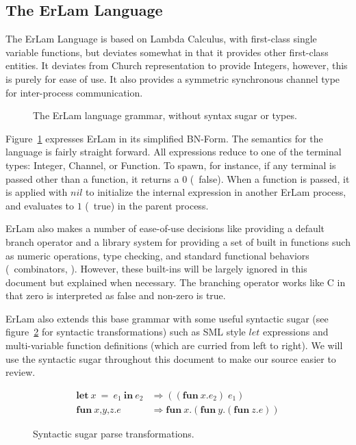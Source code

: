\subsection{The ErLam Language}\label{sec:the erlam language}

The ErLam Language is based on Lambda Calculus, with first-class single 
variable functions, but deviates somewhat in that it provides other first-class 
entities. It deviates from Church representation to provide Integers, however, this is
purely for ease of use. It also provides a symmetric synchronous channel type 
for inter-process communication.

\begin{figure} %
\centering
{\footnotesize
    
}
\caption{The ErLam language grammar, without syntax sugar or types.}
\label{fig:grammer}
\end{figure}

Figure~\ref{fig:grammer} expresses ErLam in its simplified BN-Form. The 
semantics for the language is fairly straight forward. All expressions reduce
to one of the terminal types: Integer, Channel, or Function. To spawn, for 
instance, if any terminal is passed other than a function, it returns a $0$
(\eg~false). When a function is passed, it is applied with $nil$ to 
initialize the internal expression in another ErLam process, and evaluates 
to $1$ (\eg~true) in the parent process.

ErLam also makes a number of ease-of-use decisions like providing a default 
branch operator and a library system for providing a set of built in functions 
such as numeric operations, type checking, and standard functional behaviors 
(\eg~combinators, \etc). However, these built-ins will be largely ignored in 
this document but explained when necessary. The branching operator works like
C in that zero is interpreted as false and non-zero is true.

ErLam also extends this base grammar with some useful syntactic sugar (see 
figure~\ref{fig:sugar-transform} for syntactic transformations) such as SML 
style $let$ expressions and multi-variable function definitions (which are 
curried from left to right). We will use the syntactic sugar throughout this 
document to make our source easier to review.

\begin{figure}
    \centering
    \begin{align*}
        \textbf{let}\: x\: =\: e_1\: \textbf{in}\: e_2
        & \Rightarrow
        ((\textbf{fun}\: x.e_2)\; e_1) \\
% 
        \textbf{fun}\: \textit{x,y,z} . \textit{e}
        & \Rightarrow
        \textbf{fun}\: \textit{x} . (\textbf{fun}\: \textit{y} . (\textbf{fun}\: \textit{z} . \textit{e} ))
    \end{align*}
    \caption{Syntactic sugar parse transformations.}
    \label{fig:sugar-transform}
\end{figure}

